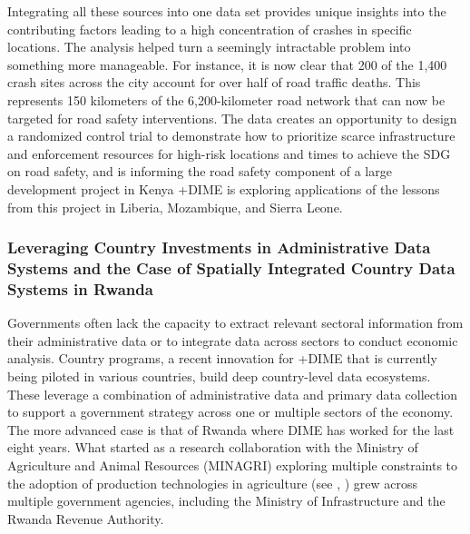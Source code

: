\documentclass[
]{book}
\begin{document}
Integrating all these sources into one data set provides unique insights into the contributing factors leading to a high concentration of crashes in specific locations. The analysis helped turn a seemingly intractable problem into something more manageable. For instance, it is now clear that 200 of the 1,400 crash sites across the city account for over half of road traffic deaths. This represents 150 kilometers of the 6,200-kilometer road network that can now be targeted for road safety interventions. The data creates an opportunity to design a randomized control trial to demonstrate how to prioritize scarce infrastructure and enforcement resources for high-risk locations and times to achieve the SDG on road safety, and is informing the road safety component of a large development project in Kenya +DIME\textbar{} is exploring applications of the lessons from this project in Liberia, Mozambique, and Sierra Leone.

\hypertarget{leveraging-country-investments-in-administrative-data-systems-and-the-case-of-spatially-integrated-country-data-systems-in-rwanda}{%
\subsubsection{Leveraging Country Investments in Administrative Data Systems and the Case of Spatially Integrated Country Data Systems in Rwanda}\label{leveraging-country-investments-in-administrative-data-systems-and-the-case-of-spatially-integrated-country-data-systems-in-rwanda}}

Governments often lack the capacity to extract relevant sectoral information from their administrative data or to integrate data across sectors to conduct economic analysis. Country programs, a recent innovation for +DIME\textbar{} that is currently being piloted in various countries, build deep country-level data ecosystems. These leverage a combination of administrative data and primary data collection to support a government strategy across one or multiple sectors of the economy. The more advanced case is that of Rwanda where DIME has worked for the last eight years. What started as a research collaboration with the Ministry of Agriculture and Animal Resources (MINAGRI) exploring multiple constraints to the adoption of production technologies in agriculture (see \citet{jones2018}, \citet{jones2019}) grew across multiple government agencies, including the Ministry of Infrastructure and the Rwanda Revenue Authority.
\end{document}
